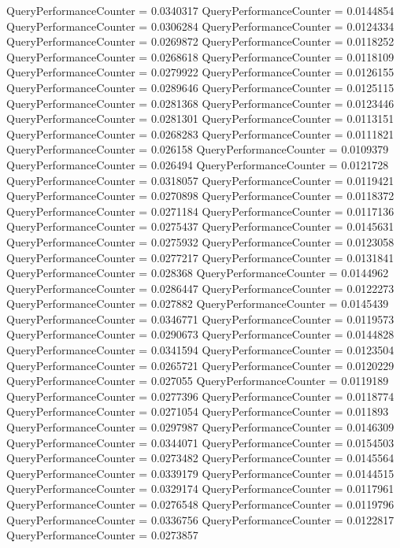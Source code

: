 \documentclass[9pt]{article}
\theoremstyle{plain}
\theoremstyle{definition}
\theoremstyle{remark}
\numberwithin{equation}{section}
\begin{document}
QueryPerformanceCounter  =  0.0340317
QueryPerformanceCounter  =  0.0144854
QueryPerformanceCounter  =  0.0306284
QueryPerformanceCounter  =  0.0124334
QueryPerformanceCounter  =  0.0269872
QueryPerformanceCounter  =  0.0118252
QueryPerformanceCounter  =  0.0268618
QueryPerformanceCounter  =  0.0118109
QueryPerformanceCounter  =  0.0279922
QueryPerformanceCounter  =  0.0126155
QueryPerformanceCounter  =  0.0289646
QueryPerformanceCounter  =  0.0125115
QueryPerformanceCounter  =  0.0281368
QueryPerformanceCounter  =  0.0123446
QueryPerformanceCounter  =  0.0281301
QueryPerformanceCounter  =  0.0113151
QueryPerformanceCounter  =  0.0268283
QueryPerformanceCounter  =  0.0111821
QueryPerformanceCounter  =  0.026158
QueryPerformanceCounter  =  0.0109379
QueryPerformanceCounter  =  0.026494
QueryPerformanceCounter  =  0.0121728
QueryPerformanceCounter  =  0.0318057
QueryPerformanceCounter  =  0.0119421
QueryPerformanceCounter  =  0.0270898
QueryPerformanceCounter  =  0.0118372
QueryPerformanceCounter  =  0.0271184
QueryPerformanceCounter  =  0.0117136
QueryPerformanceCounter  =  0.0275437
QueryPerformanceCounter  =  0.0145631
QueryPerformanceCounter  =  0.0275932
QueryPerformanceCounter  =  0.0123058
QueryPerformanceCounter  =  0.0277217
QueryPerformanceCounter  =  0.0131841
QueryPerformanceCounter  =  0.028368
QueryPerformanceCounter  =  0.0144962
QueryPerformanceCounter  =  0.0286447
QueryPerformanceCounter  =  0.0122273
QueryPerformanceCounter  =  0.027882
QueryPerformanceCounter  =  0.0145439
QueryPerformanceCounter  =  0.0346771
QueryPerformanceCounter  =  0.0119573
QueryPerformanceCounter  =  0.0290673
QueryPerformanceCounter  =  0.0144828
QueryPerformanceCounter  =  0.0341594
QueryPerformanceCounter  =  0.0123504
QueryPerformanceCounter  =  0.0265721
QueryPerformanceCounter  =  0.0120229
QueryPerformanceCounter  =  0.027055
QueryPerformanceCounter  =  0.0119189
QueryPerformanceCounter  =  0.0277396
QueryPerformanceCounter  =  0.0118774
QueryPerformanceCounter  =  0.0271054
QueryPerformanceCounter  =  0.011893
QueryPerformanceCounter  =  0.0297987
QueryPerformanceCounter  =  0.0146309
QueryPerformanceCounter  =  0.0344071
QueryPerformanceCounter  =  0.0154503
QueryPerformanceCounter  =  0.0273482
QueryPerformanceCounter  =  0.0145564
QueryPerformanceCounter  =  0.0339179
QueryPerformanceCounter  =  0.0144515
QueryPerformanceCounter  =  0.0329174
QueryPerformanceCounter  =  0.0117961
QueryPerformanceCounter  =  0.0276548
QueryPerformanceCounter  =  0.0119796
QueryPerformanceCounter  =  0.0336756
QueryPerformanceCounter  =  0.0122817
QueryPerformanceCounter  =  0.0273857
\end{document}
